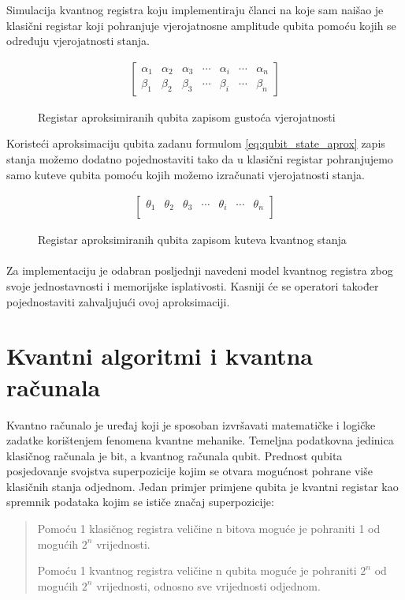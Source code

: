 \documentclass[times, utf8, zavrsni, numeric]{fer}
\begin{document}
\newpage

Simulacija kvantnog registra koju implementiraju članci na koje sam naišao je klasični registar koji pohranjuje vjerojatnosne amplitude qubita pomoću kojih se određuju vjerojatnosti stanja. \citep{han_qga_combinat}\citep{han_analysis}\citep{han_phd}
\begin{figure}[htb]
\centering
\begin{align*}
\begin{bmatrix}
\alpha_1 & \alpha_2 & \alpha_3 & \cdots & \alpha_i & \cdots & \alpha_n \\
\beta_1 & \beta_2 & \beta_3 & \cdots & \beta_i & \cdots & \beta_n
\end{bmatrix}
\end{align*}
\caption{Registar aproksimiranih qubita zapisom gustoća vjerojatnosti}
\end{figure}

Koristeći aproksimaciju qubita zadanu formulom \ref{eq:qubit_state_aprox} zapis stanja možemo dodatno pojednostaviti tako da u klasični registar pohranjujemo samo kuteve qubita pomoću kojih možemo izračunati vjerojatnosti stanja.
\begin{figure}[htb]
\centering
\begin{align*}
\begin{bmatrix}
\theta_1 & \theta_2 & \theta_3 & \cdots & \theta_i & \cdots & \theta_n \\
\end{bmatrix}
\end{align*}
\caption{Registar aproksimiranih qubita zapisom kuteva kvantnog stanja}
\end{figure}

\paragraph{}
Za implementaciju je odabran posljednji navedeni model kvantnog registra zbog svoje jednostavnosti i memorijske isplativosti. Kasniji će se operatori također pojednostaviti zahvaljujući ovoj aproksimaciji.

\clearpage

\section{Kvantni algoritmi i kvantna računala}
Kvantno računalo je uređaj koji je sposoban izvršavati matematičke i logičke zadatke korištenjem fenomena kvantne mehanike. Temeljna podatkovna jedinica klasičnog računala je bit, a kvantnog računala qubit. Prednost qubita posjedovanje svojstva superpozicije kojim se otvara mogućnost pohrane više klasičnih stanja odjednom. Jedan primjer primjene qubita je kvantni registar kao spremnik podataka kojim se ističe značaj superpozicije:
\begin{quote}
Pomoću 1 klasičnog registra veličine n bitova moguće je pohraniti 1 od mogućih $2^n$ vrijednosti.

Pomoću 1 kvantnog registra veličine n qubita moguće je pohraniti $2^n$ od mogućih $2^n$ vrijednosti, odnosno sve vrijednosti odjednom. \citep{qga}
\end{quote}
\end{document}
